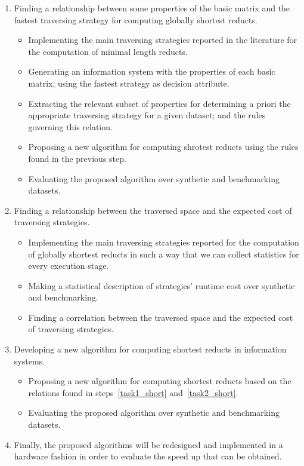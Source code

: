 \documentclass[authoryear,11pt]{elsarticle}
\begin{document}
\begin{enumerate}
  	\item Finding a relationship between some properties of the basic matrix and the fastest 
  		  traversing strategy for computing globally shortest reducts.\label{task1_short}
	\begin{itemize}
  		\item Implementing the main traversing strategies reported in the literature for the computation of 
  			  minimal length reducts.
  		\item Generating an information system with the properties of each basic matrix, using 
  			  the fastest strategy as decision attribute.
  		\item Extracting the relevant subset of properties for determining a priori the appropriate 
  			  traversing strategy for a given dataset; and the rules governing this relation.
  		\item Proposing a new algorithm for computing shrotest reducts using the rules found in
  			  the previous step.
  		\item Evaluating the proposed algorithm over synthetic and benchmarking datasets.
  	\end{itemize}
  	\item Finding a relationship between the traversed space and the expected cost of traversing strategies.
  	\label{task2_short}
  	\begin{itemize}
  		\item Implementing the main traversing strategies reported for the computation of globally shortest 
  			  reducts in such a way that we can collect statistics for every execution stage.
  		\item Making a statistical description  of strategies' runtime cost over synthetic and benchmarking.
  		\item Finding a correlation between the traversed space and the expected cost of traversing strategies.
  	\end{itemize}
  	\item Developing a new algorithm for computing shortest reducts in information systems.
  	\begin{itemize}
  		\item Proposing a new algorithm for computing shortest reducts based on the relations found in 
  			  steps~\ref{task1_short} and~\ref{task2_short}.
  		\item Evaluating the proposed algorithm over synthetic and benchmarking datasets.
  	\end{itemize}
  	\item Finally, the proposed algorithms will be redesigned and implemented in a hardware fashion in order to 
  		  evaluate the speed up that can be obtained.
\end{enumerate}
\end{document}
